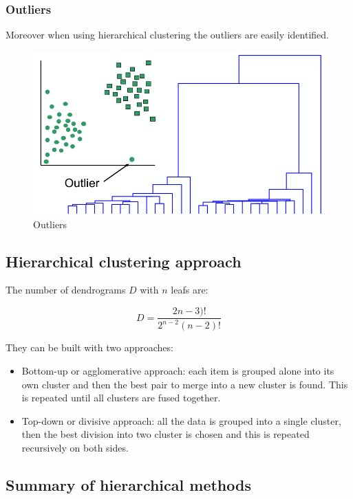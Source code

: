 			\subsubsection{Outliers}
			Moreover when using hierarchical clustering the outliers are easily identified.

			\begin{figure}[H]
				\includegraphics[width=\textwidth]{outliers}
				\caption{Outliers}
				\label{fig:dendrogram}
			\end{figure}

	\subsection{Hierarchical clustering approach}
	The number of dendrograms $D$ with $n$ leafs are:

	$$D = \frac{2n-3)!}{2^{n-2}(n-2)!}$$

	They can be built with two approaches:

	\begin{itemize}
		\item Bottom-up or agglomerative approach: each item is grouped alone into its own cluster and then the best pair to merge into a new cluster is found.
			This is repeated until all clusters are fused together.
		\item Top-down or divisive approach: all the data is grouped into a single cluster, then the best division into two cluster is chosen and this is repeated recursively on both sides.
	\end{itemize}

	\subsection{Summary of hierarchical methods}

